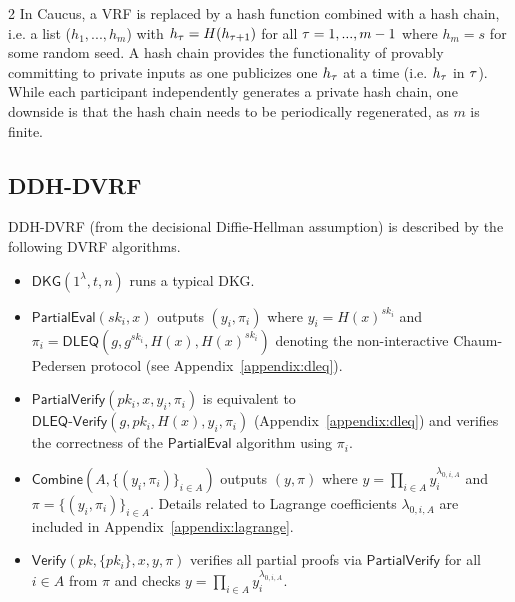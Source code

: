\begin{table*}[h!]
\begin{threeparttable}
\begin{tablenotes}[flushleft]
\item[2] In Caucus, a VRF is replaced by a hash function combined with a hash chain, i.e. a list ($h_1, ..., h_m$) with $h_\tau = H(h_{\tau + 1})$ for all $\tau = 1, ..., m - 1$ where $h_m = s$ for some random seed. A hash chain provides the functionality of provably committing to private inputs as one publicizes one $h_\tau$ at a time (i.e. $h_\tau$ in \epoch $\tau$). While each participant independently generates a private hash chain, one downside is that the hash chain needs to be periodically regenerated, as $m$ is finite.
\end{tablenotes}
\end{threeparttable}
\end{table*}

\subsection{DDH-DVRF}
\label{appendix:ddh-dvrf}
DDH-DVRF (from the decisional Diffie-Hellman assumption) is described by the following DVRF algorithms.
\begin{itemize}
\item $\mathsf{DKG}(1^\lambda, t, n)$ runs a typical DKG.
\item $\mathsf{PartialEval}(sk_i, x)$ outputs $(y_i, \pi_i)$ where $y_i = H(x)^{sk_i}$ and $\pi_i = \mathsf{DLEQ}(g, g^{sk_i}, H(x), H(x)^{sk_i})$ denoting the non-interactive Chaum-Pedersen protocol (see Appendix~\ref{appendix:dleq}).
\item $\mathsf{PartialVerify}(pk_i, x, y_i, \pi_i)$ is equivalent to $\mathsf{DLEQ}\text{-}\mathsf{Verify}(g, pk_i, H(x), y_i, \pi_i)$ (Appendix~\ref{appendix:dleq}) and verifies the correctness of the $\mathsf{PartialEval}$ algorithm using $\pi_i$.
\item $\mathsf{Combine}(A, \{(y_i, \pi_i)\}_{i \in A})$ outputs $(y, \pi)$ where $y = \prod_{i \in A} y_i^{\lambda_{0, i, A}}$ and $\pi = \{(y_i, \pi_i)\}_{i \in A}$. Details related to Lagrange coefficients $\lambda_{0, i, A}$ are included in Appendix~\ref{appendix:lagrange}.
\item $\mathsf{Verify}(pk, \{pk_i\}, x, y, \pi)$ verifies all partial proofs via $\mathsf{PartialVerify}$ for all $i \in A$ from $\pi$ and checks $y = \prod_{i \in A} y_i^{\lambda_{0, i, A}}$.
\end{itemize}

